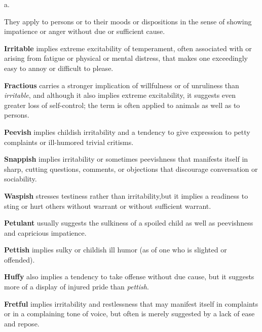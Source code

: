 \begin{description}[style=unboxed]
 a.

\begin{mynewitemize}
\item They apply to persons or to their moods or dispositions in the sense of
showing impatience or anger without due or sufficient cause.

\item \textbf{Irritable} implies extreme excitability of temperament, often
associated with or arising from fatigue or physical or mental distress, that 
makes one exceedingly easy to annoy or difficult to please.

\item \textbf{Fractious} carries a stronger implication of willfulness or of 
unruliness than \textit{irritable}, and although it also implies extreme
excitability, it suggests even greater loss of self-control; the term is
often applied to animals as well as to persons.

\item \textbf{Peevish} implies childish irritability and a tendency to give
expression to petty complaints or ill-humored trivial critisms.

\item \textbf{Snappish} implies irritability or sometimes peevishness that
manifests itself in sharp, cutting questions, comments, or objections that
discourage conversation or sociability.

\item \textbf{Waspish} stresses testiness rather than irritability,but it 
implies a readiness to sting or hurt others without warrant or without sufficient
warrant.

\item \textbf{Petulant} usually suggests the sulkiness of a spoiled child as
well as peevishness and capricious impatience.

\item \textbf{Pettish} implies sulky or childish ill humor (as of one who
is slighted or offended).

\item \textbf{Huffy} also implies a tendency to take offense without due cause,
but it suggests more of a display of injured pride than \textit{pettish}.

\item \textbf{Fretful} implies irritability and restlessness that may manifest
itself in complaints or in a complaining tone of voice, but often is merely
suggested by a lack of ease and repose.


\end{mynewitemize}
\end{description}
